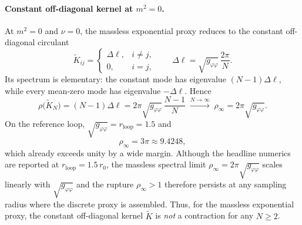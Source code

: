 \documentclass{iopjournal}
\theoremstyle{remark}
\begin{document}
\paragraph{Constant off-diagonal kernel at $m^{2}=0$.}
At $m^{2}=0$ and $\nu=0$, the massless exponential proxy reduces to the constant off-diagonal circulant
\begin{equation}
\label{eq:massless-kernel}
\widetilde{K}_{ij}
=
\begin{cases}
\Delta\ell, & i\neq j,\\
0, & i=j,
\end{cases}
\qquad
\Delta\ell=\sqrt{g_{\varphi\varphi}}\,\frac{2\pi}{N}.
\end{equation}
Its spectrum is elementary: the constant mode has eigenvalue $(N-1)\Delta\ell$, while every mean-zero mode has eigenvalue $-\Delta\ell$.
Hence
\begin{equation}
\label{eq:massless-rho}
\rho\bigl(\widetilde{K}_{N}\bigr)
=
(N-1)\Delta\ell
=
2\pi\sqrt{g_{\varphi\varphi}}\,\frac{N-1}{N}
\;\xrightarrow{N\to\infty}\;
\rho_{\infty}
=
2\pi\sqrt{g_{\varphi\varphi}}.
\end{equation}
On the reference loop, $\sqrt{g_{\varphi\varphi}}=r_{\mathrm{loop}}=1.5$ and
\begin{equation}
\label{eq:rho-infty-num}
\rho_{\infty}=3\pi\approx 9.4248,
\end{equation}
which already exceeds unity by a wide margin.
Although the headline numerics are reported at $r_{\mathrm{loop}}=1.5\,r_{0}$, the massless spectral limit $\rho_{\infty}=2\pi\sqrt{g_{\varphi\varphi}}$ scales linearly with $\sqrt{g_{\varphi\varphi}}$ and the rupture $\rho_{\infty}>1$ therefore persists at any sampling radius where the discrete proxy is assembled.
Thus, for the massless exponential proxy, the constant off-diagonal kernel $\widetilde{K}$ is \emph{not} a contraction for any $N\ge 2$.
\end{document}
